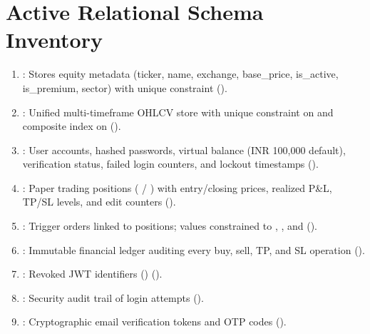 \section{Active Relational Schema Inventory}
\begin{enumerate}[leftmargin=6mm,itemsep=1.5mm]
    \item \textbf{}: Stores equity metadata (ticker, name, exchange, base\_price, is\_active, is\_premium, sector) with unique constraint  ().
    \item \textbf{}: Unified multi-timeframe OHLCV store with unique constraint  on  and composite index  on  ().
    \item \textbf{}: User accounts, hashed passwords, virtual balance (INR 100,000 default), verification status, failed login counters, and lockout timestamps ().
    \item \textbf{}: Paper trading positions ( / ) with entry/closing prices, realized P\&L, TP/SL levels, and edit counters ().
    \item \textbf{}: Trigger orders linked to positions;  values constrained to , , and  ().
    \item \textbf{}: Immutable financial ledger auditing every buy, sell, TP, and SL operation ().
    \item \textbf{}: Revoked JWT identifiers () ().
    \item \textbf{}: Security audit trail of login attempts ().
    \item \textbf{}: Cryptographic email verification tokens and OTP codes ().
\end{enumerate}

